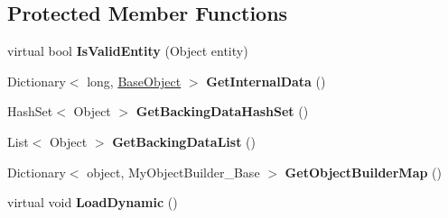 \subsection*{Protected Member Functions}
\begin{DoxyCompactItemize}
\item 
\hypertarget{class_s_e_mod_a_p_i_internal_1_1_a_p_i_1_1_entity_1_1_base_object_manager_aef5534ea42124066a46da767f41c2615}{}virtual bool {\bfseries Is\+Valid\+Entity} (Object entity)\label{class_s_e_mod_a_p_i_internal_1_1_a_p_i_1_1_entity_1_1_base_object_manager_aef5534ea42124066a46da767f41c2615}

\item 
\hypertarget{class_s_e_mod_a_p_i_internal_1_1_a_p_i_1_1_entity_1_1_base_object_manager_aad6da704ebeb6099d0890e35d9df5c0b}{}Dictionary$<$ long, \hyperlink{class_s_e_mod_a_p_i_internal_1_1_a_p_i_1_1_entity_1_1_base_object}{Base\+Object} $>$ {\bfseries Get\+Internal\+Data} ()\label{class_s_e_mod_a_p_i_internal_1_1_a_p_i_1_1_entity_1_1_base_object_manager_aad6da704ebeb6099d0890e35d9df5c0b}

\item 
\hypertarget{class_s_e_mod_a_p_i_internal_1_1_a_p_i_1_1_entity_1_1_base_object_manager_a7f5ce5b2e0e03baeef845c5996d253c9}{}Hash\+Set$<$ Object $>$ {\bfseries Get\+Backing\+Data\+Hash\+Set} ()\label{class_s_e_mod_a_p_i_internal_1_1_a_p_i_1_1_entity_1_1_base_object_manager_a7f5ce5b2e0e03baeef845c5996d253c9}

\item 
\hypertarget{class_s_e_mod_a_p_i_internal_1_1_a_p_i_1_1_entity_1_1_base_object_manager_a4e675e78b42d11846a09454e249efe3b}{}List$<$ Object $>$ {\bfseries Get\+Backing\+Data\+List} ()\label{class_s_e_mod_a_p_i_internal_1_1_a_p_i_1_1_entity_1_1_base_object_manager_a4e675e78b42d11846a09454e249efe3b}

\item 
\hypertarget{class_s_e_mod_a_p_i_internal_1_1_a_p_i_1_1_entity_1_1_base_object_manager_aee35b59ad3e86da7b3bb84ff34a8f4d1}{}Dictionary$<$ object, My\+Object\+Builder\+\_\+\+Base $>$ {\bfseries Get\+Object\+Builder\+Map} ()\label{class_s_e_mod_a_p_i_internal_1_1_a_p_i_1_1_entity_1_1_base_object_manager_aee35b59ad3e86da7b3bb84ff34a8f4d1}

\item 
\hypertarget{class_s_e_mod_a_p_i_internal_1_1_a_p_i_1_1_entity_1_1_base_object_manager_a6390069e3161ef72bffcee39d85c4069}{}virtual void {\bfseries Load\+Dynamic} ()\label{class_s_e_mod_a_p_i_internal_1_1_a_p_i_1_1_entity_1_1_base_object_manager_a6390069e3161ef72bffcee39d85c4069}


\end{DoxyCompactItemize}
